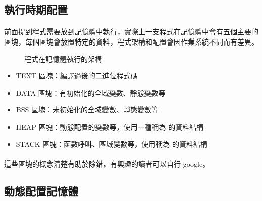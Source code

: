 \documentclass[12pt,a4paper,oneside]{report}
\begin{document}
\begin{CJK}{UTF8}{bkai}
\subsection{執行時期配置}

\paragraph{}前面提到程式需要放到記憶體中執行，實際上一支程式在記憶體中會有五個主要的區塊，每個區塊會放置特定的資料，程式架構和配置會因作業系統不同而有差異。

\begin{figure}[h!]
\centering
{}
\caption{程式在記憶體執行的架構}
\label{program:struct:fig:program}
\end{figure}

\begin{itemize}
\item TEXT 區塊：編譯過後的二進位程式碼
\item DATA 區塊：有初始化的全域變數、靜態變數等
\item BSS 區塊：未初始化的全域變數、靜態變數等
\item HEAP 區塊：動態配置的變數等，使用一種稱為 的資料結構
\item STACK 區塊：函數呼叫、區域變數等，使用稱為 的資料結構
\end{itemize}

\paragraph{}這些區塊的概念清楚有助於除錯，有興趣的讀者可以自行 google。

\subsection{動態配置記憶體}


\end{CJK}
\end{document}
